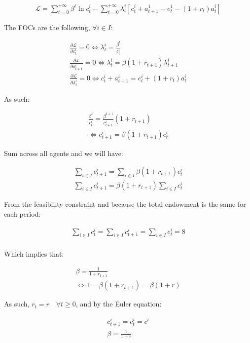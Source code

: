 \documentclass{article}
\begin{document}
\begin{gather*}
    \mathcal{L}=\sum_{t=0}^{+\infty}\beta^t\ln{c_t^i}-\sum_{t=0}^{+\infty}\lambda_t^i[c_t^i+a_{t+1}^1-e_t^1-(1+r_t)a_t^i]
\end{gather*}

The FOCs are the following, $\forall i\in I$:

\begin{gather*}
    \frac{\partial\mathcal{L}}{\partial c_t^i}=0\Leftrightarrow\lambda_t^i=\frac{\beta^t}{c_t^i}\\
    \frac{\partial\mathcal{L}}{\partial a_{t+1}^i}=0\Leftrightarrow\lambda_t^i=\beta(1+r_{t+1})\lambda_{t+1}^i\\
    \frac{\partial\mathcal{L}}{\partial \lambda_{t}^i}=0\Leftrightarrow c_t^i+a_{t+1}^i=e_t^i+(1+r_t)a_t^i
\end{gather*}

As such:

\begin{gather*}
    \frac{\beta^t}{c_t^i}=\frac{\beta^{t+1}}{c_{t+1}^i}(1+r_{t+1})\\
    \Leftrightarrow{c_{t+1}^i}=\beta(1+r_{t+1}){c_{t}^i}
\end{gather*}

Sum across all agents and we will have:

\begin{gather*}
    \sum_{i\in I}c_{t+1}^i=\sum_{i\in I}\beta(1+r_{t+1}){c_{t}^i}\\
    \sum_{i\in I}c_{t+1}^i=\beta(1+r_{t+1})\sum_{i\in I}{c_{t}^i}
\end{gather*}

From the feasibility constraint and because the total endowment is the same for each period:

\begin{gather*}
    \sum_{i\in I}c_t^i= \sum_{i\in I}c_{t+1}^i=\sum_{i\in I}e_t^i=8\\
\end{gather*}

Which implies that:

\begin{gather*}
    \beta=\frac{1}{1+r_{t+1}}\\
    \Leftrightarrow 1=\beta\left(1+r_{t+1}\right)=\beta\left({1+r}\right)
\end{gather*}

As such, $r_t=r\quad\forall t\geq0$, and by the Euler equation:

\begin{gather*}
    c_{t+1}^i=c_t^i=c^i\\
    \beta=\frac{1}{1+r}
\end{gather*}
\end{document}
